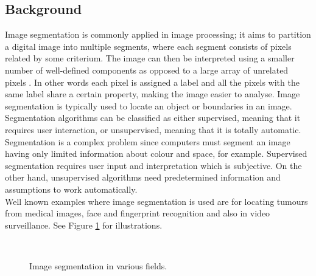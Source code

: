 \documentclass[a4paper,10pt]{article}
\begin{document}
\subsection{Background}
Image segmentation is commonly applied in image processing; it
aims to partition a digital image into multiple segments, where each
  segment consists of pixels related by some criterium.
The image can then be interpreted using a smaller number of
well-defined components as opposed to a large array of unrelated pixels \cite{segmentation}.  
In other words each pixel is assigned a label and all the pixels with the same
label share a certain
property, making the image easier to analyse. Image segmentation is
typically used to locate an object or boundaries in an image. \\

Segmentation algorithms can be classified as either supervised, meaning that
it requires user interaction, or unsupervised, meaning that it is totally
automatic.  Segmentation is a complex problem since computers must segment
an
image having only limited information about colour and space, for
example.
Supervised segmentation requires user input and interpretation which is subjective.  
On the other hand,
unsupervised algorithms need predetermined information and assumptions to work
automatically. \\

Well known examples where image segmentation is used are
for locating tumours from medical images, face and
fingerprint recognition and also in video surveillance.  See Figure \ref{examples} for illustrations.

\begin{figure}[H]
\centering
\mbox{ \quad
{}}
\caption{Image segmentation in various fields.}
\label{examples}
\end{figure}
\end{document}
